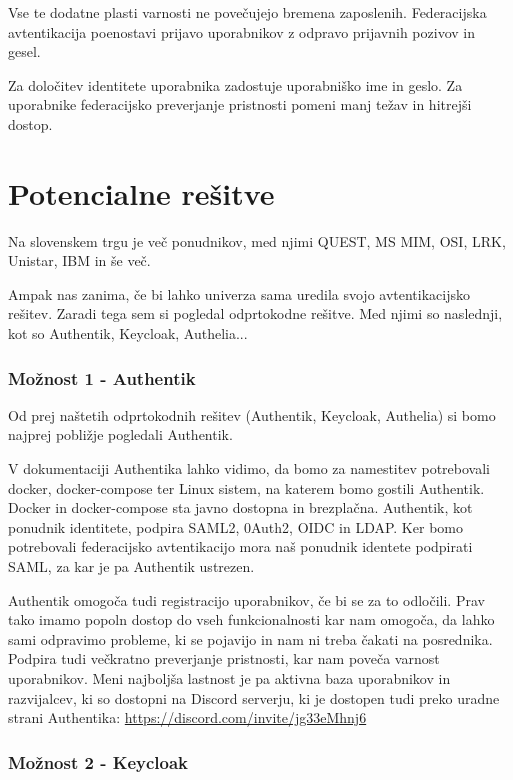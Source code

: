 \documentclass[a4paper,12pt,openright]{book}
\begin{document}
Vse te dodatne plasti varnosti ne povečujejo bremena zaposlenih. Federacijska avtentikacija poenostavi prijavo uporabnikov z odpravo prijavnih pozivov in gesel.

Za določitev identitete uporabnika zadostuje uporabniško ime in geslo. Za uporabnike federacijsko preverjanje pristnosti pomeni manj težav in hitrejši dostop.


\chapter{Potencialne rešitve}

Na slovenskem trgu je več ponudnikov, med njimi QUEST, MS MIM, OSI, LRK, Unistar, IBM in še več.

Ampak nas zanima, če bi lahko univerza sama uredila svojo avtentikacijsko rešitev. Zaradi tega sem si pogledal odprtokodne rešitve. Med njimi so naslednji, kot so Authentik, Keycloak, Authelia...


\subsection{Možnost 1 - Authentik}

Od prej naštetih odprtokodnih rešitev (Authentik, Keycloak, Authelia) si bomo najprej pobližje pogledali Authentik. 

V dokumentaciji Authentika\cite{AuthentikLink} lahko vidimo, da bomo za namestitev potrebovali docker, docker-compose ter Linux sistem, na katerem bomo gostili Authentik. Docker in docker-compose sta javno dostopna in brezplačna. 
\newline    
Authentik, kot ponudnik identitete, podpira SAML2, 0Auth2, OIDC in LDAP. Ker bomo potrebovali federacijsko avtentikacijo mora naš ponudnik identete podpirati SAML, za kar je pa Authentik ustrezen. 

Authentik omogoča tudi registracijo uporabnikov, če bi se za to odločili. Prav tako imamo popoln dostop do vseh funkcionalnosti kar nam omogoča, da lahko sami odpravimo probleme, ki se pojavijo in nam ni treba čakati na posrednika. Podpira tudi večkratno preverjanje pristnosti, kar nam poveča varnost uporabnikov. 
\newline    
Meni najboljša lastnost je pa aktivna baza uporabnikov in razvijalcev, ki so dostopni na Discord serverju, ki je dostopen tudi preko uradne strani Authentika: \url{https://discord.com/invite/jg33eMhnj6}

\subsection{Možnost 2 - Keycloak}
\end{document}
